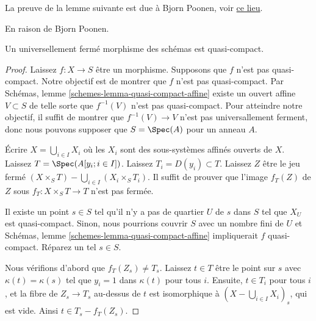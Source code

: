 \noindent
La preuve de la lemme suivante est due à Bjorn Poonen, voir \href{https://mathoverflow.net/questions/23337/is-a-universally-closed-morphism-of-schemes-quasi-compact/23528#23528}{ce lieu}.

\begin{lemma}

\label{lemma-universally-closed-quasi-compact}

\begin{reference}
En raison de Bjorn Poonen.
\end{reference}
Un universellement fermé morphisme des schémas est quasi-compact.
\end{lemma}

\begin{proof}
Laissez $f : X \to S$ être un morphisme. Supposons que $f$ n'est pas quasi-compact. Notre objectif est de montrer que $f$ n'est pas quasi-compact. Par Schémas, lemme \ref{schemes-lemma-quasi-compact-affine} existe un ouvert affine $V \subset S$ de telle sorte que $f^{-1}(V)$ n'est pas quasi-compact. Pour atteindre notre objectif, il suffit de montrer que $f^{-1}(V) \to V$ n'est pas universallement ferment, donc nous pouvons supposer que $S = \Spec(A)$ pour un anneau $A$.

\medskip\noindent
Écrire $X = \bigcup_{i \in I} X_i$ où les $X_i$ sont des sous-systèmes affinés ouverts de $X$. Laissez $T = \Spec(A[y_i ; i \in I])$. Laissez $T_i = D(y_i) \subset T$. Laissez $Z$ être le jeu fermé $(X \times_S T) - \bigcup_{i \in I} (X_i \times_S T_i)$. Il suffit de prouver que l'image $f_T(Z)$ de $Z$ sous $f_T : X \times_S T \to T$ n'est pas fermée.

\medskip\noindent
Il existe un point $s \in S$ tel qu'il n'y a pas de quartier $U$ de $s$ dans $S$ tel que $X_U$ est quasi-compact. Sinon, nous pourrions couvrir $S$ avec un nombre fini de $U$ et Schémas, lemme \ref{schemes-lemma-quasi-compact-affine} impliquerait $f$ quasi-compact. Réparez un tel $s \in S$.

\medskip\noindent
Nous vérifions d'abord que $f_T(Z_s) \ne T_s$. Laissez $t \in T$ être le point sur $s$ avec $\kappa(t) = \kappa(s)$ tel que $y_i = 1$ dans $\kappa(t)$ pour tous $i$. Ensuite, $t \in T_i$ pour tous $i$, et la fibre de $Z_s \to T_s$ au-dessus de $t$ est isomorphique à $(X - \bigcup_{i \in I} X_i)_s$, qui est vide. Ainsi $t \in T_s - f_T(Z_s)$.

\medskip\noindent


\end{proof}
